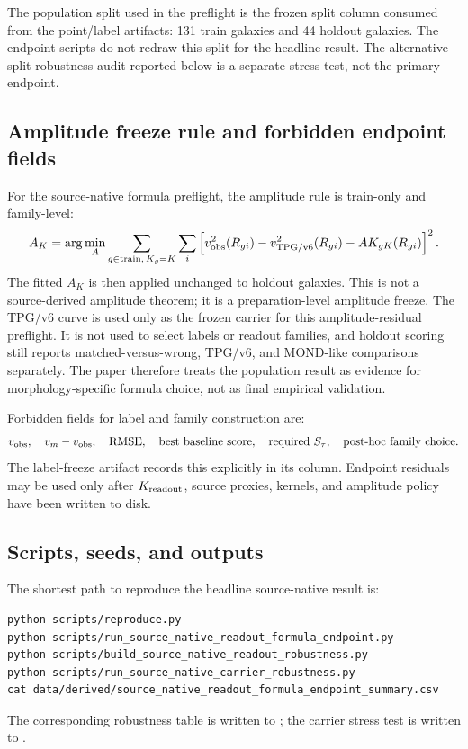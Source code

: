 \documentclass[11pt]{article}
\begin{document}
The population split used in the preflight is the frozen split column consumed
from the point/label artifacts: 131 train galaxies and 44 holdout galaxies.
The endpoint scripts do not redraw this split for the headline result.  The
alternative-split robustness audit reported below is a separate stress test,
not the primary endpoint.

\subsection{Amplitude freeze rule and forbidden endpoint fields}

For the source-native formula preflight, the amplitude rule is train-only and
family-level:
\[
A_K
=
\arg\min_A
\sum_{g\in{\rm train},\,K_g=K}
\sum_i
\left[
v_{\rm obs}^2(R_{gi})-v_{\rm TPG/v6}^2(R_{gi})
-A K_{gK}(R_{gi})
\right]^2 .
\]
The fitted \(A_K\) is then applied unchanged to holdout galaxies.  This is not
a source-derived amplitude theorem; it is a preparation-level amplitude freeze.
The TPG/v6 curve is used only as the frozen carrier for this amplitude-residual
preflight.  It is not used to select labels or readout families, and holdout
scoring still reports matched-versus-wrong, TPG/v6, and MOND-like comparisons
separately.
The paper therefore treats the population result as evidence for
morphology-specific formula choice, not as final empirical validation.

Forbidden fields for label and family construction are:
\[
v_{\rm obs},\quad
v_m-v_{\rm obs},\quad
{\rm RMSE},\quad
\hbox{best baseline score},\quad
\hbox{required }S_\tau,\quad
\hbox{post-hoc family choice}.
\]
The label-freeze artifact records this explicitly in its
 column.  Endpoint residuals may be used only after
\(K_{\rm readout}\), source proxies, kernels, and amplitude policy have been
written to disk.

\subsection{Scripts, seeds, and outputs}

The shortest path to reproduce the headline source-native result is:
\begin{verbatim}
python scripts/reproduce.py
python scripts/run_source_native_readout_formula_endpoint.py
python scripts/build_source_native_readout_robustness.py
python scripts/run_source_native_carrier_robustness.py
cat data/derived/source_native_readout_formula_endpoint_summary.csv
\end{verbatim}
The corresponding robustness table is written to
; the
carrier stress test is written to
.
\end{document}
